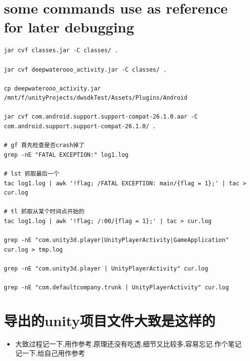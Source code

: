 \documentclass[9pt, b5paper]{article}
\begin{document}
\section{some commands use as reference for later debugging}
\label{sec-2}
\begin{verbatim}
jar cvf classes.jar -C classes/ .

jar cvf deepwaterooo_activity.jar -C classes/ .       

cp deepwaterooo_activity.jar /mnt/f/unityProjects/dwsdkTest/Assets/Plugins/Android 

jar cvf com.android.support.support-compat-26.1.0.aar -C com.android.support.support-compat-26.1.0/ .

# gf 首先检查是否crash掉了 
grep -nE "FATAL EXCEPTION:" log1.log

# lst 抓取最后一个
tac log1.log | awk '!flag; /FATAL EXCEPTION: main/{flag = 1};' | tac > cur.log

# tl 抓取从某个时间点开始的
tac log1.log | awk '!flag; /:00/{flag = 1};' | tac > cur.log

grep -nE "com.unity3d.player|UnityPlayerActivity|GameApplication" cur.log > tmp.log

grep -nE "com.unity3d.player | UnityPlayerActivity" cur.log

grep -nE "com.defaultcompany.trunk | UnityPlayerActivity" cur.log
\end{verbatim}

\section{导出的unity项目文件大致是这样的}
\label{sec-3}
\begin{itemize}
\item 大致过程记一下,用作参考,原理还没有吃透,细节又比较多,容易忘记.作个笔记记一下,给自己用作参考
\end{itemize}
\end{document}
